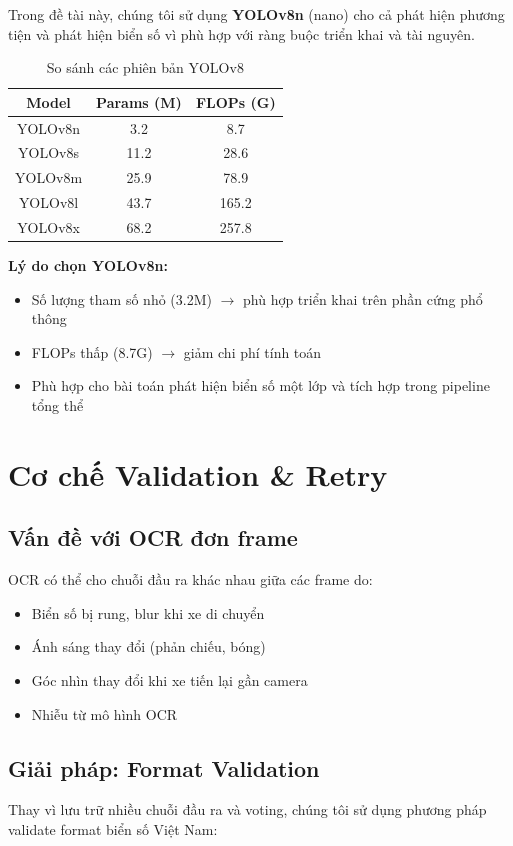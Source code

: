 Trong đề tài này, chúng tôi sử dụng \textbf{YOLOv8n} (nano) cho cả phát hiện phương tiện và phát hiện biển số vì phù hợp với ràng buộc triển khai và tài nguyên.

\begin{table}[!ht]
\centering
\caption{So sánh các phiên bản YOLOv8}
\label{tab:yolov8_versions}
\begin{tabular}{|c|c|c|}
\hline
\textbf{Model} & \textbf{Params (M)} & \textbf{FLOPs (G)} \\ \hline
YOLOv8n & 3.2 & 8.7 \\ \hline
YOLOv8s & 11.2 & 28.6 \\ \hline
YOLOv8m & 25.9 & 78.9 \\ \hline
YOLOv8l & 43.7 & 165.2 \\ \hline
YOLOv8x & 68.2 & 257.8 \\ \hline
\end{tabular}
\end{table}

\textbf{Lý do chọn YOLOv8n:}
\begin{itemize}
    \item Số lượng tham số nhỏ (3.2M) $\rightarrow$ phù hợp triển khai trên phần cứng phổ thông
    \item FLOPs thấp (8.7G) $\rightarrow$ giảm chi phí tính toán
    \item Phù hợp cho bài toán phát hiện biển số một lớp và tích hợp trong pipeline tổng thể
\end{itemize}

\section{Cơ chế Validation \& Retry}

\subsection{Vấn đề với OCR đơn frame}
OCR có thể cho chuỗi đầu ra khác nhau giữa các frame do:
\begin{itemize}
    \item Biển số bị rung, blur khi xe di chuyển
    \item Ánh sáng thay đổi (phản chiếu, bóng)
    \item Góc nhìn thay đổi khi xe tiến lại gần camera
    \item Nhiễu từ mô hình OCR
\end{itemize}

\subsection{Giải pháp: Format Validation}
Thay vì lưu trữ nhiều chuỗi đầu ra và voting, chúng tôi sử dụng phương pháp validate format biển số Việt Nam:

